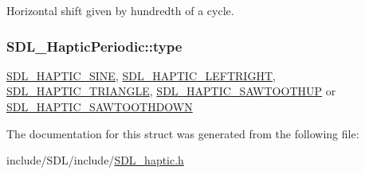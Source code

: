 Horizontal shift given by hundredth of a cycle. \hypertarget{struct_s_d_l___haptic_periodic_ac53c5725e8cff012e9b90e01b7110869}{
\subsubsection[{type}]{ S\-D\-L\-\_\-\-Haptic\-Periodic\-::type}}\label{struct_s_d_l___haptic_periodic_ac53c5725e8cff012e9b90e01b7110869}
\hyperlink{_s_d_l__haptic_8h_aa6d75adbfcdda5075078e7a2849da5c0}{S\-D\-L\-\_\-\-H\-A\-P\-T\-I\-C\-\_\-\-S\-I\-N\-E}, \hyperlink{_s_d_l__haptic_8h_ae047624d8458ff6400887c37a36f86d3}{S\-D\-L\-\_\-\-H\-A\-P\-T\-I\-C\-\_\-\-L\-E\-F\-T\-R\-I\-G\-H\-T}, \hyperlink{_s_d_l__haptic_8h_ae8123eaa51511507375ba6ef9220fa46}{S\-D\-L\-\_\-\-H\-A\-P\-T\-I\-C\-\_\-\-T\-R\-I\-A\-N\-G\-L\-E}, \hyperlink{_s_d_l__haptic_8h_ab8e3f40f3c2bcee8905d13b634363c3f}{S\-D\-L\-\_\-\-H\-A\-P\-T\-I\-C\-\_\-\-S\-A\-W\-T\-O\-O\-T\-H\-U\-P} or \hyperlink{_s_d_l__haptic_8h_afd64aa747034a7ccf4b55f6246525701}{S\-D\-L\-\_\-\-H\-A\-P\-T\-I\-C\-\_\-\-S\-A\-W\-T\-O\-O\-T\-H\-D\-O\-W\-N} 

The documentation for this struct was generated from the following file\-:\begin{DoxyCompactItemize}
\item 
include/\-S\-D\-L/include/\hyperlink{_s_d_l__haptic_8h}{S\-D\-L\-\_\-haptic.\-h}\end{DoxyCompactItemize}
